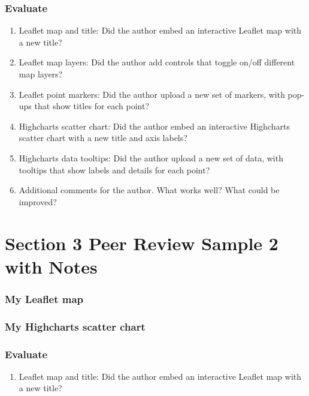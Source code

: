 \documentclass[
  english,
]{book}
\providecommand{\tightlist}{%
  \setlength{\itemsep}{0pt}\setlength{\parskip}{0pt}}
\begin{document}
\hypertarget{evaluate-6}{%
\subsubsection{Evaluate}\label{evaluate-6}}

\begin{enumerate}
\def\labelenumi{\arabic{enumi}.}
\tightlist
\item
  Leaflet map and title: Did the author embed an interactive Leaflet map with a new title?
\item
  Leaflet map layers: Did the author add controls that toggle on/off different map layers?
\item
  Leaflet point markers: Did the author upload a new set of markers, with pop-ups that show titles for each point?
\item
  Highcharts scatter chart: Did the author embed an interactive Highcharts scatter chart with a new title and axis labels?
\item
  Highcharts data tooltips: Did the author upload a new set of data, with tooltips that show labels and details for each point?
\item
  Additional comments for the author. What works well? What could be improved?
\end{enumerate}

\hypertarget{peer-3-sample-2-notes}{%
\section{Section 3 Peer Review Sample 2 with Notes}\label{peer-3-sample-2-notes}}

\hypertarget{my-leaflet-map-3}{%
\subsubsection{My Leaflet map}\label{my-leaflet-map-3}}

\hypertarget{my-highcharts-scatter-chart-3}{%
\subsubsection{My Highcharts scatter chart}\label{my-highcharts-scatter-chart-3}}

\hypertarget{evaluate-7}{%
\subsubsection{Evaluate}\label{evaluate-7}}

\begin{enumerate}
\def\labelenumi{\arabic{enumi}.}
\tightlist
\item
  Leaflet map and title: Did the author embed an interactive Leaflet map with a new title?
\end{enumerate}
\end{document}
